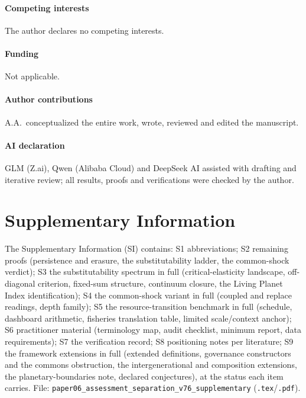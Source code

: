 \documentclass[preprint,11pt,authoryear]{elsarticle}
\theoremstyle{definition}
\theoremstyle{remark}
\begin{document}
\paragraph{Competing interests} The author declares no competing interests.
\paragraph{Funding} Not applicable.
\paragraph{Author contributions} A.A.\ conceptualized the entire work, wrote, reviewed and edited the manuscript.
\paragraph{AI declaration} GLM (Z.ai), Qwen (Alibaba Cloud) and DeepSeek AI assisted with drafting and iterative review; all results, proofs and verifications were checked by the author.

\section*{Supplementary Information}
The Supplementary Information (SI) contains: S1 abbreviations; S2 remaining proofs (persistence and erasure, the substitutability ladder, the common-shock verdict); S3 the substitutability spectrum in full (critical-elasticity landscape, off-diagonal criterion, fixed-sum structure, continuum closure, the Living Planet Index identification); S4 the common-shock variant in full (coupled and replace readings, depth family); S5 the resource-transition benchmark in full (schedule, dashboard arithmetic, fisheries translation table, limited scale/context anchor); S6 practitioner material (terminology map, audit checklist, minimum report, data requirements); S7 the verification record; S8 positioning notes per literature; S9 the framework extensions in full (extended definitions, governance constructors and the commons obstruction, the intergenerational and composition extensions, the planetary-boundaries note, declared conjectures), at the status each item carries. File: \texttt{paper06\_assessment\_separation\_v76\_supplementary} (\texttt{.tex}/\texttt{.pdf}).
\end{document}

